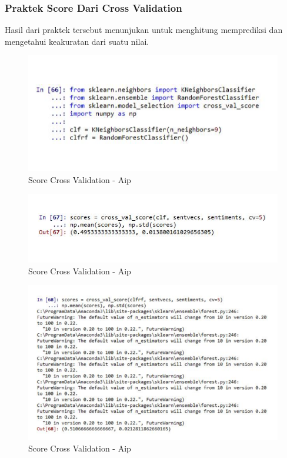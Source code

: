 \subsubsection{Praktek Score Dari Cross Validation}
Hasil dari praktek tersebut menunjukan untuk menghitung memprediksi dan mengetahui keakuratan dari suatu nilai.
\begin{figure}[ht]
\centering
\includegraphics[scale=0.3]{figures/AIP/e31.PNG}
\caption{Score Cross Validation - Aip}
\label{Score Cross Validation - Aip}
\end{figure}

\begin{figure}[ht]
\centering
\includegraphics[scale=0.3]{figures/AIP/e32.PNG}
\caption{Score Cross Validation - Aip}
\label{Score Cross Validation - Aip}
\end{figure}

\begin{figure}[ht]
\centering
\includegraphics[scale=0.3]{figures/AIP/e33.PNG}
\caption{Score Cross Validation - Aip}
\label{Score Cross Validation - Aip}
\end{figure}

